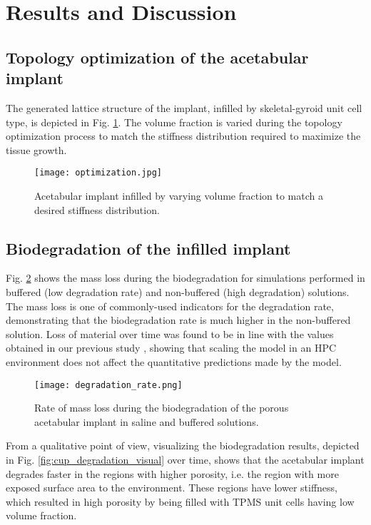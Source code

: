 \section{Results and Discussion}

\subsection{Topology optimization of the acetabular implant}

The generated lattice structure of the implant, infilled by skeletal-gyroid unit cell type, is depicted in Fig. \ref{fig:cup_optimization}. The volume fraction is varied during the topology optimization process to match the stiffness distribution required to maximize the tissue growth.

\begin{figure}[h]
\centering
\medskip
\texttt{[image: optimization.jpg]}
\caption[Infilled acetabular implant]{Acetabular implant infilled by varying volume fraction to match a desired stiffness distribution.} \label{fig:cup_optimization}
\end{figure}

\subsection{Biodegradation of the infilled implant}

Fig. \ref{fig:cup_degradation_rate} shows the mass loss during the biodegradation for simulations performed in buffered (low degradation rate) and non-buffered (high degradation) solutions. The mass loss is one of commonly-used indicators for the degradation rate, demonstrating that the biodegradation rate is much higher in the non-buffered solution. Loss of material over time was found to be in line with the values obtained in our previous study \cite{Barzegari2021}, showing that scaling the model in an HPC environment does not affect the quantitative predictions made by the model.

\begin{figure}[h]
\centering
\medskip
\texttt{[image: degradation\_rate.png]}
\caption[Biodegradation rate for the acetabular implant]{Rate of mass loss during the biodegradation of the porous acetabular implant in saline and buffered solutions.} \label{fig:cup_degradation_rate}
\end{figure}

From a qualitative point of view, visualizing the biodegradation results, depicted in Fig. \ref{fig:cup_degradation_visual} over time, shows that the acetabular implant degrades faster in the regions with higher porosity, i.e. the region with more exposed surface area to the environment. These regions have lower stiffness, which resulted in high porosity by being filled with TPMS unit cells having low volume fraction.

